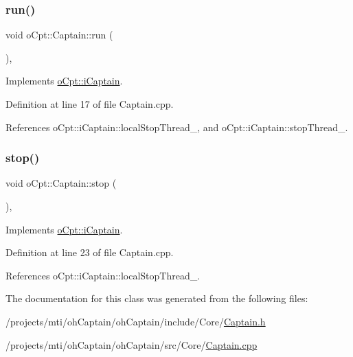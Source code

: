 \hypertarget{classo_cpt_1_1_captain_ade0ca7804340b555a9ead5dd01465045}{}\label{classo_cpt_1_1_captain_ade0ca7804340b555a9ead5dd01465045} 
\subsubsection{\texorpdfstring{run()}{run()}}
{\footnotesize\ttfamily void o\+Cpt\+::\+Captain\+::run (\begin{DoxyParamCaption}{ }\end{DoxyParamCaption})\hspace{0.3cm}{\ttfamily [override]}, {\ttfamily [virtual]}}



Implements \hyperlink{classo_cpt_1_1i_captain_a53d61f2d68b435f32ad66858ae898763}{o\+Cpt\+::i\+Captain}.



Definition at line 17 of file Captain.\+cpp.



References o\+Cpt\+::i\+Captain\+::local\+Stop\+Thread\+\_\+, and o\+Cpt\+::i\+Captain\+::stop\+Thread\+\_\+.

\hypertarget{classo_cpt_1_1_captain_aa8a3923b961f4bc2ebc857895f759711}{}\label{classo_cpt_1_1_captain_aa8a3923b961f4bc2ebc857895f759711} 
\subsubsection{\texorpdfstring{stop()}{stop()}}
{\footnotesize\ttfamily void o\+Cpt\+::\+Captain\+::stop (\begin{DoxyParamCaption}{ }\end{DoxyParamCaption})\hspace{0.3cm}{\ttfamily [override]}, {\ttfamily [virtual]}}



Implements \hyperlink{classo_cpt_1_1i_captain_aeda385ea9a0ee33301dfda05098c836b}{o\+Cpt\+::i\+Captain}.



Definition at line 23 of file Captain.\+cpp.



References o\+Cpt\+::i\+Captain\+::local\+Stop\+Thread\+\_\+.



The documentation for this class was generated from the following files\+:\begin{DoxyCompactItemize}
\item 
/projects/mti/oh\+Captain/oh\+Captain/include/\+Core/\hyperlink{_captain_8h}{Captain.\+h}\item 
/projects/mti/oh\+Captain/oh\+Captain/src/\+Core/\hyperlink{_captain_8cpp}{Captain.\+cpp}\end{DoxyCompactItemize}
